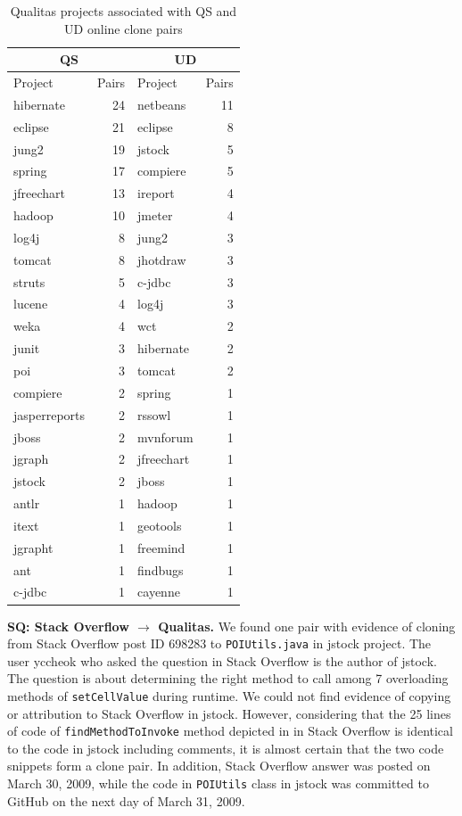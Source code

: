 \documentclass[10pt,journal,compsoc]{IEEEtran}
\begin{document}
\begin{table}
	\centering
	\caption{Qualitas projects associated with QS and UD online clone pairs}
	\label{tab:qs_qualitas_projects}
	\begin{tabular}{lrlr}
		\toprule
		\multicolumn{2}{c}{QS} & \multicolumn{2}{c}{UD} \\
		\midrule
		Project & Pairs & Project & Pairs\\
		\midrule
		hibernate & 24 & netbeans & 11 \\
		eclipse & 21 & eclipse & 8 \\
		jung2 & 19 & jstock & 5 \\
		spring & 17 & compiere & 5 \\
		jfreechart & 13 & ireport & 4 \\
		hadoop & 10 & jmeter & 4 \\
		log4j & 8 & jung2 & 3 \\
		tomcat & 8 & jhotdraw & 3 \\
		struts & 5 & c-jdbc & 3 \\
		lucene & 4 & log4j & 3 \\
		weka & 4 & wct & 2 \\
		junit & 3 & hibernate & 2 \\
		poi & 3 & tomcat & 2 \\
		compiere & 2 & spring & 1 \\
		jasperreports & 2 & rssowl & 1 \\
		jboss & 2 & mvnforum & 1 \\
		jgraph & 2 & jfreechart & 1 \\
		jstock & 2 & jboss & 1 \\
		antlr & 1 & hadoop & 1 \\
		itext & 1 & geotools & 1 \\
		jgrapht & 1 & freemind & 1 \\
		ant & 1 & findbugs & 1 \\
		c-jdbc & 1 & cayenne & 1 \\
		\bottomrule
	\end{tabular} 
\end{table}

\textbf{SQ: Stack Overflow $\rightarrow$ Qualitas.} We found one pair with
evidence of cloning from Stack Overflow post ID 698283 to
{\small\texttt{POIUtils.java}} in \textsf{jstock} project. The user
\textsf{yccheok} who asked the question in Stack Overflow is the author of
\textsf{jstock}. The question is about determining the right method to call
among 7 overloading methods of {\small\texttt{setCellValue}} during runtime. We
could not find evidence of copying or attribution to Stack Overflow in
\textsf{jstock}. However, considering that the 25 lines of code of
{\small\texttt{findMethodToInvoke}} method depicted in  in Stack
Overflow is identical to the code in \textsf{jstock} including comments, it is almost certain that
the two code snippets form a clone pair. In addition, Stack Overflow answer was
posted on March 30, 2009, while the code in {\small\texttt{POIUtils}} class in
\textsf{jstock} was committed to GitHub on the next day of March 31, 2009.
\end{document}
